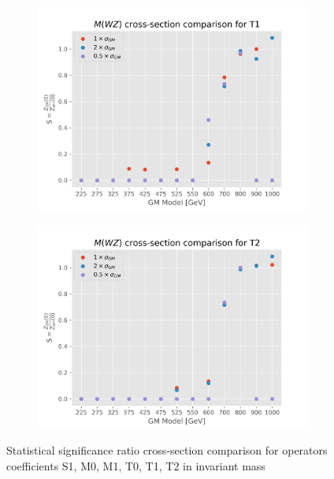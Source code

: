 \documentclass[../Bachelorarbeit.tex]{subfiles}
\begin{document}
\begin{figure}[h]
\begin{subfigure}{0.45\textwidth}
        \includegraphics[width=\textwidth]{Plots/gm_relevanze/MWZ_comparision_T1.png}
    \end{subfigure}
    \begin{subfigure}{0.45\textwidth}
        \includegraphics[width=\textwidth]{Plots/gm_relevanze/MWZ_comparision_T2.png}
    \end{subfigure}
    \caption{Statistical significance ratio cross-section comparison for operators coefficients S1, M0, M1, T0, T1, T2 in invariant mass}
\end{figure}
\end{document}
